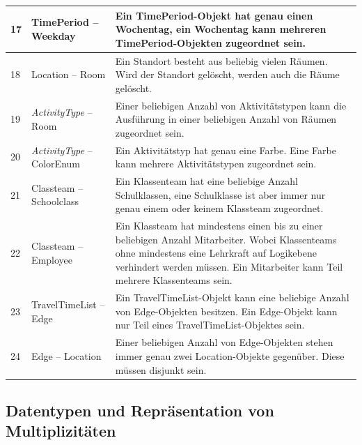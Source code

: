 \documentclass[fontsize=12pt,paper=a4,twoside]{scrartcl}
\begin{document}
\begin{tabularx}{\textwidth}{|p{0.6cm}|p{5cm}|X|}
\hline
17 	& TimePeriod -- Weekday & Ein TimePeriod-Objekt hat genau einen Wochentag, ein Wochentag kann 
	mehreren TimePeriod-Objekten zugeordnet sein.\\\hline 
18	& Location -- Room						& Ein Standort besteht aus beliebig vielen Räumen. 
	Wird der Standort gelöscht, werden auch die Räume gelöscht.\\\hline
19	& \textit{ActivityType} -- Room					& Einer beliebigen Anzahl von Aktivitätstypen
	kann die Ausführung in einer beliebigen Anzahl von Räumen zugeordnet sein. \\\hline
20	& \textit{ActivityType} -- ColorEnum 		& Ein Aktivitätstyp hat genau eine Farbe. Eine
	Farbe kann mehrere Aktivitätstypen zugeordnet sein.\\\hline
21	& Classteam -- Schoolclass 					& Ein Klassenteam hat eine beliebige Anzahl 
	Schulklassen, eine Schulklasse ist aber immer nur genau einem oder keinem Klassteam zugeordnet.\\\hline
22	& Classteam -- Employee 					& Ein Klassteam hat mindestens einen bis zu 
	einer beliebigen Anzahl Mitarbeiter. Wobei Klassenteams ohne mindestens eine Lehrkraft auf Logikebene verhindert werden müssen. Ein Mitarbeiter kann Teil mehrere Klassenteams sein. \\\hline
23	& TravelTimeList -- Edge 					& Ein TravelTimeList-Objekt kann eine beliebige
	Anzahl von Edge-Objekten besitzen. Ein Edge-Objekt kann nur Teil eines TravelTimeList-Objektes sein. \\\hline
24	& Edge -- Location							& Einer beliebigen Anzahl von Edge-Objekten stehen 
	immer genau zwei Location-Objekte gegenüber. Diese müssen disjunkt sein. \\\hline 
\end{tabularx}
\subsection{Datentypen und Repräsentation von Multiplizitäten}
\end{document}
